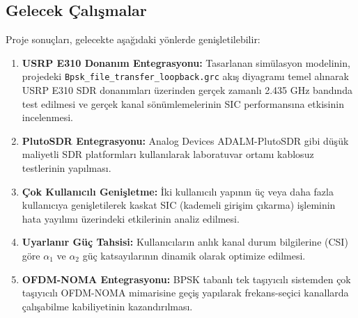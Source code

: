 \subsection{Gelecek Çalışmalar}
Proje sonuçları, gelecekte aşağıdaki yönlerde genişletilebilir:
\begin{enumerate}
    \item \textbf{USRP E310 Donanım Entegrasyonu:} Tasarlanan simülasyon modelinin, projedeki \texttt{Bpsk\_file\_transfer\_loopback.grc} akış diyagramı temel alınarak USRP E310 SDR donanımları üzerinden gerçek zamanlı 2.435 GHz bandında test edilmesi ve gerçek kanal sönümlemelerinin SIC performansına etkisinin incelenmesi.
    \item \textbf{PlutoSDR Entegrasyonu:} Analog Devices ADALM-PlutoSDR gibi düşük maliyetli SDR platformları kullanılarak laboratuvar ortamı kablosuz testlerinin yapılması.
    \item \textbf{Çok Kullanıcılı Genişletme:} İki kullanıcılı yapının üç veya daha fazla kullanıcıya genişletilerek kaskat SIC (kademeli girişim çıkarma) işleminin hata yayılımı üzerindeki etkilerinin analiz edilmesi.
    \item \textbf{Uyarlanır Güç Tahsisi:} Kullanıcıların anlık kanal durum bilgilerine (CSI) göre $\alpha_1$ ve $\alpha_2$ güç katsayılarının dinamik olarak optimize edilmesi.
    \item \textbf{OFDM-NOMA Entegrasyonu:} BPSK tabanlı tek taşıyıcılı sistemden çok taşıyıcılı OFDM-NOMA mimarisine geçiş yapılarak frekans-seçici kanallarda çalışabilme kabiliyetinin kazandırılması.
\end{enumerate}
